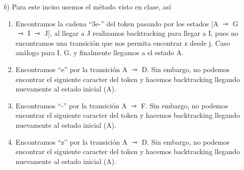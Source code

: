 \begin{itemize}
{alusión a $A_e$ para no confundir con el carácter A.}, B, C, D, E, F, G, H, J, y K.
\item[$b$)] Para este inciso usemos el método visto en clase, así
  \begin{enumerate}
  \item Encontramos la cadena ``3e-'' del token pasando por los estados [A $\rightarrowtriangle$
    G $\rightarrowtriangle$ I $\rightarrowtriangle$ J], al llegar a J realizamos backtracking para
    llegar a I, pues no encontramos una transición que nos permita encontrar z desde j. Caso análogo
    para I, G, y finalmente llegamos a el estado A.
  \item Encontramos ``e'' por la transición A $\rightarrowtriangle$ D. Sin embargo, no podemos encontrar
    el siguiente caracter del token y hacemos backtracking llegando nuevamente al estado inicial (A).
  \item Encontramos ``-'' por la transición A $\rightarrowtriangle$ F. Sin embargo, no podemos encontrar
    el siguiente caracter del token y hacemos backtracking llegando nuevamente al estado inicial (A).
  \item Encontramos ``z'' por la transición A $\rightarrowtriangle$ D. Sin embargo, no podemos encontrar
    el siguiente caracter del token y hacemos backtracking llegando nuevamente al estado inicial (A).
  \end{enumerate}
\end{itemize}
